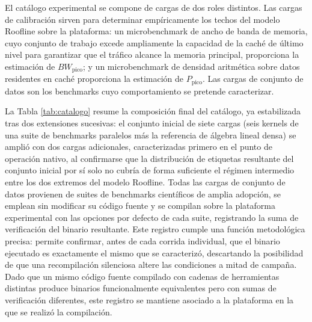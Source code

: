 \documentclass[12pt,oneside,spanish]{book}
\begin{document}
El catálogo experimental se compone de cargas de dos roles distintos. Las cargas de calibración sirven para determinar empíricamente los techos del modelo Roofline sobre la plataforma: un microbenchmark de ancho de banda de memoria, cuyo conjunto de trabajo excede ampliamente la capacidad de la caché de último nivel para garantizar que el tráfico alcance la memoria principal, proporciona la estimación de $BW_{\text{pico}}$; y un microbenchmark de densidad aritmética sobre datos residentes en caché proporciona la estimación de $P_{\text{pico}}$. Las cargas de conjunto de datos son los benchmarks cuyo comportamiento se pretende caracterizar.

La Tabla \ref{tab:catalogo} resume la composición final del catálogo, ya estabilizada tras dos extensiones sucesivas: el conjunto inicial de siete cargas (seis kernels de una suite de benchmarks paralelos más la referencia de álgebra lineal densa) se amplió con dos cargas adicionales, caracterizadas primero en el punto de operación nativo, al confirmarse que la distribución de etiquetas resultante del conjunto inicial por sí solo no cubría de forma suficiente el régimen intermedio entre los dos extremos del modelo Roofline. Todas las cargas de conjunto de datos provienen de suites de benchmarks científicos de amplia adopción, se emplean sin modificar su código fuente y se compilan sobre la plataforma experimental con las opciones por defecto de cada suite, registrando la suma de verificación del binario resultante. Este registro cumple una función metodológica precisa: permite confirmar, antes de cada corrida individual, que el binario ejecutado es exactamente el mismo que se caracterizó, descartando la posibilidad de que una recompilación silenciosa altere las condiciones a mitad de campaña. Dado que un mismo código fuente compilado con cadenas de herramientas distintas produce binarios funcionalmente equivalentes pero con sumas de verificación diferentes, este registro se mantiene asociado a la plataforma en la que se realizó la compilación.
\end{document}
